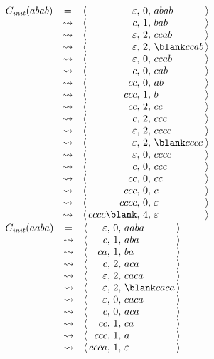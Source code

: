 \begin{exercice}
\begin{correction}
    $\begin{array}{rc@{\quad \langle\,}r@{,~}c@{,~}l@{\,\rangle}}
      C_{\mathit{init}}(abab)
      & =        & \varepsilon & 0 & abab        \\
      & \leadsto & c           & 1 & bab         \\
      & \leadsto & \varepsilon & 2 & ccab        \\
      & \leadsto & \varepsilon & 2 & \blank ccab \\
      & \leadsto & \varepsilon & 0 & ccab        \\
      & \leadsto & c           & 0 & cab         \\
      & \leadsto & cc          & 0 & ab          \\
      & \leadsto & ccc         & 1 & b           \\
      & \leadsto & cc          & 2 & cc          \\
      & \leadsto & c           & 2 & ccc         \\
      & \leadsto & \varepsilon & 2 & cccc        \\
      & \leadsto & \varepsilon & 2 & \blank cccc \\
      & \leadsto & \varepsilon & 0 & cccc        \\
      & \leadsto & c           & 0 & ccc         \\
      & \leadsto & cc          & 0 & cc          \\
      & \leadsto & ccc         & 0 & c           \\
      & \leadsto & cccc        & 0 & \varepsilon \\
      & \leadsto & cccc\blank  & 4 & \varepsilon \\
    \end{array}$
    $\begin{array}{rc@{\quad \langle\,}r@{,~}c@{,~}l@{\,\rangle}}
      C_{\mathit{init}}(aaba)
      & =        & \varepsilon & 0 & aaba        \\
      & \leadsto & c           & 1 & aba         \\
      & \leadsto & ca          & 1 & ba          \\
      & \leadsto & c           & 2 & aca         \\
      & \leadsto & \varepsilon & 2 & caca        \\
      & \leadsto & \varepsilon & 2 & \blank caca \\
      & \leadsto & \varepsilon & 0 & caca        \\
      & \leadsto & c           & 0 & aca         \\
      & \leadsto & cc          & 1 & ca          \\
      & \leadsto & ccc         & 1 & a           \\
      & \leadsto & ccca        & 1 & \varepsilon \\
    \end{array}$
  \end{correction}
  

\end{exercice}
